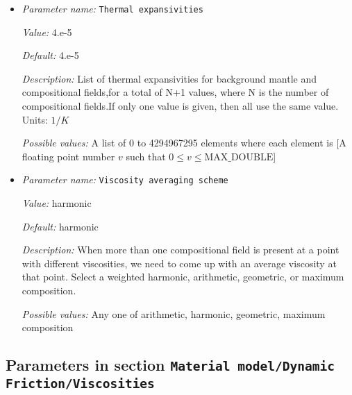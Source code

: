 \begin{itemize}
{\it Value:} 4.7


{\it Default:} 4.7


{\it Description:} List of thermal conductivities for background mantle and compositional fields,for a total of N+1 values, where N is the number of compositional fields.If only one value is given, then all use the same value. Units: $W/m/K$ 


{\it Possible values:} A list of 0 to 4294967295 elements where each element is [A floating point number $v$ such that $0 \leq v \leq \text{MAX\_DOUBLE}$]
\item {\it Parameter name:} {\tt Thermal expansivities}
\label{parameters:Material model/Dynamic Friction/Thermal expansivities}


{\it Value:} 4.e-5


{\it Default:} 4.e-5


{\it Description:} List of thermal expansivities for background mantle and compositional fields,for a total of N+1 values, where N is the number of compositional fields.If only one value is given, then all use the same value. Units: $1/K$


{\it Possible values:} A list of 0 to 4294967295 elements where each element is [A floating point number $v$ such that $0 \leq v \leq \text{MAX\_DOUBLE}$]
\item {\it Parameter name:} {\tt Viscosity averaging scheme}
\label{parameters:Material model/Dynamic Friction/Viscosity averaging scheme}


{\it Value:} harmonic


{\it Default:} harmonic


{\it Description:} When more than one compositional field is present at a point with different viscosities, we need to come up with an average viscosity at that point.  Select a weighted harmonic, arithmetic, geometric, or maximum composition.


{\it Possible values:} Any one of arithmetic, harmonic, geometric, maximum composition
\end{itemize}



\subsection{Parameters in section \tt Material model/Dynamic Friction/Viscosities}
\label{parameters:Material_20model/Dynamic_20Friction/Viscosities}

